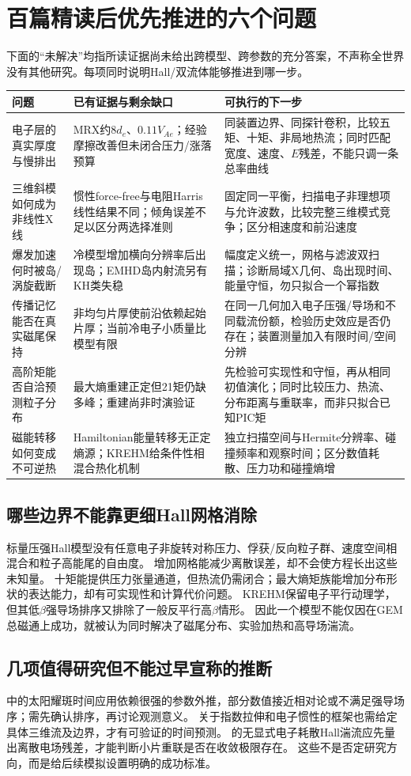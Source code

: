 \section{百篇精读后优先推进的六个问题}
下面的“未解决”均指所读证据尚未给出跨模型、跨参数的充分答案，不声称全世界没有其他研究。每项同时说明Hall/双流体能够推进到哪一步。

\begin{longtable}{P{30mm}P{57mm}P{61mm}}
\toprule 问题 & 已有证据与剩余缺口 & 可执行的下一步\\\midrule\endhead
电子层的真实厚度与慢排出 & MRX约$8d_e$、$0.11V_{\!Ae}$；经验摩擦改善但未闭合压力/涨落预算\citep{L119} & 同装置边界、同探针卷积，比较五矩、十矩、非局地热流；同时匹配宽度、速度、$E$残差，不能只调一条总率曲线\\
三维斜模如何成为非线性X线 & 惯性force-free与电阻Harris线性结果不同；倾角误差不足以区分两选择准则\citep{L224,L268,L166} & 固定同一平衡，扫描电子非理想项与允许波数，比较完整三维模式竞争；区分相速度和前沿速度\\
爆发加速何时被岛/涡旋截断 & 冷模型增加横向分辨率后出现岛；EMHD岛内射流另有KH类失稳\citep{L191,F697,E459} & 幅度定义统一，网格与滤波双扫描；诊断局域X几何、岛出现时间、能量守恒，勿只拟合一个幂指数\\
传播记忆能否在真实磁尾保持 & 非均匀片厚使前沿依赖起始片厚；当前冷电子小质量比模型有限\citep{L294} & 在同一几何加入电子压强/导场和不同载流份额，检验历史效应是否仍存在；装置测量加入有限时间/空间分辨\\
高阶矩能否自洽预测粒子分布 & 最大熵重建正定但21矩仍缺多峰；重建尚非时演验证\citep{E553} & 先检验可实现性和守恒，再从相同初值演化；同时比较压力、热流、分布距离与重联率，而非只拟合已知PIC矩\\
磁能转移如何变成不可逆热 & Hamiltonian能量转移无正定熵源；KREHM给条件性相混合热化机制\citep{E512} & 独立扫描空间与Hermite分辨率、碰撞频率和观察时间；区分数值耗散、压力功和碰撞熵增\\
\bottomrule
\end{longtable}

\subsection{哪些边界不能靠更细Hall网格消除}
标量压强Hall模型没有任意电子非旋转对称压力、俘获/反向粒子群、速度空间相混合和粒子高能尾的自由度。
增加网格能减少离散误差，却不会使方程长出这些未知量。
十矩能提供压力张量通道，但热流仍需闭合；最大熵矩族能增加分布形状的表达能力，却有可实现性和计算代价问题。
KREHM保留电子平行动理学，但其低$\beta$强导场排序又排除了一般反平行高$\beta$情形。
因此一个模型不能仅因在GEM总磁通上成功，就被认为同时解决了磁尾分布、实验加热和高导场湍流。

\subsection{几项值得研究但不能过早宣称的推断}
\citet{F697}中的太阳耀斑时间应用依赖很强的参数外推，部分数值接近相对论或不满足强导场序；需先确认排序，再讨论观测意义。
\citet{L313}关于指数拉伸和电子惯性的框架也需给定具体三维流及边界，才有可验证的时间预测。
\citet{F644}的无显式电子耗散Hall湍流应先量出离散电场残差，才能判断小片重联是否在收敛极限存在。
这些不是否定研究方向，而是给后续模拟设置明确的成功标准。
